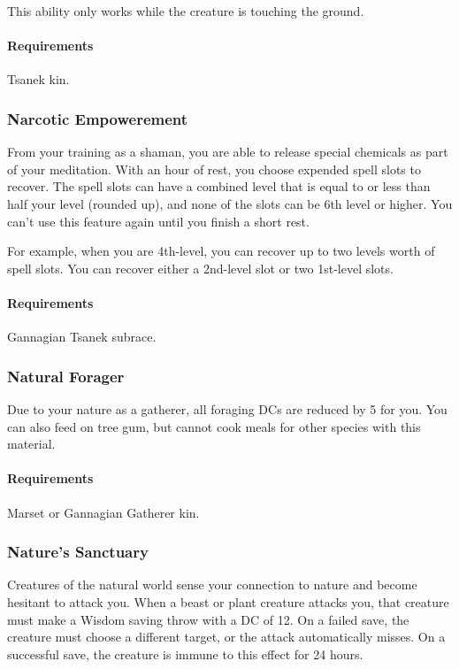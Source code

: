     This ability only works while the creature is touching the ground.
    \paragraph{Requirements} Tsanek kin.
\subsubsection{Narcotic Empowerement} \label{feat::narcoticempowerement}
    From your training as a shaman, you are able to release special chemicals as part of your meditation.
    With an hour of rest, you choose expended spell slots to recover.
    The spell slots can have a combined level that is equal to or less than half your level (rounded up), and none of the slots can be 6th level or higher.
    You can't use this feature again until you finish a short rest.

    For example, when you are 4th-level, you can recover up to two levels worth of spell slots.
    You can recover either a 2nd-level slot or two 1st-level slots.
    \paragraph{Requirements} Gannagian Tsanek subrace.
\subsubsection{Natural Forager} \label{feat::naturalforager}
    Due to your nature as a gatherer, all foraging DCs are reduced by 5 for you.
    You can also feed on tree gum, but cannot cook meals for other species with this material.
    \paragraph{Requirements} Marset or Gannagian Gatherer kin.
\subsubsection{Nature's Sanctuary} \label{feat::naturessanctuary}
    Creatures of the natural world sense your connection to nature and become hesitant to attack you.
    When a beast or plant creature attacks you, that creature must make a Wisdom saving throw with a DC of 12.
    On a failed save, the creature must choose a different target, or the attack automatically misses.
    On a successful save, the creature is immune to this effect for 24 hours.

